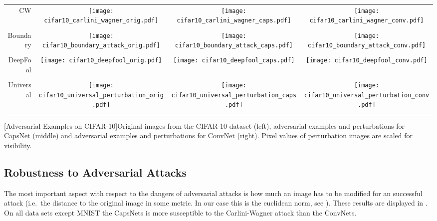 \begin{center}
\begin{longtable*}{rccc}
	
	CW & \texttt{[image: cifar10\_carlini\_wagner\_orig.pdf]} & \texttt{[image: cifar10\_carlini\_wagner\_caps.pdf]} & \texttt{[image: cifar10\_carlini\_wagner\_conv.pdf]}\\
	\\
	Boundary & \texttt{[image: cifar10\_boundary\_attack\_orig.pdf]} & \texttt{[image: cifar10\_boundary\_attack\_caps.pdf]} & \texttt{[image: cifar10\_boundary\_attack\_conv.pdf]}\\
	\\
	DeepFool & \texttt{[image: cifar10\_deepfool\_orig.pdf]} & \texttt{[image: cifar10\_deepfool\_caps.pdf]} & \texttt{[image: cifar10\_deepfool\_conv.pdf]}\\
	\\
	Universal & \texttt{[image: cifar10\_universal\_perturbation\_orig.pdf]} & \texttt{[image: cifar10\_universal\_perturbation\_caps.pdf]} & \texttt{[image: cifar10\_universal\_perturbation\_conv.pdf]}\\
	\\
\end{longtable*}
[Adversarial Examples on CIFAR-10]{Original images from the CIFAR-10 dataset (left), adversarial examples and perturbations for CapsNet (middle) and adversarial examples and perturbations for ConvNet (right). Pixel values of perturbation images are scaled for visibility.}
\label{fig:images}
\end{center}

\subsection{Robustness to Adversarial Attacks}

The most important aspect with respect to the dangers of adversarial attacks is how much an image has to be modified for an successful attack
(i.e.\ the distance to the original image in some metric. In our case this is the euclidean norm, see  ).
These results are displayed in .
On all data sets except MNIST the CapsNets is more susceptible to the Carlini-Wagner attack than the ConvNets.

